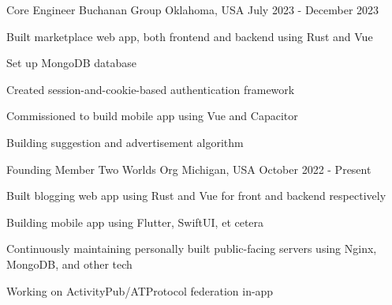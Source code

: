 
\begin{cventries}

   \cventry
   {Core Engineer} %
   {Buchanan Group} %
   {Oklahoma, USA} %
   {July 2023 - December 2023} %
   {
      \begin{cvitems}
         \item {Built marketplace web app, both frontend and backend using Rust and Vue}
         \item {Set up MongoDB database}
         \item {Created session-and-cookie-based authentication framework}
         \item {Commissioned to build mobile app using Vue and Capacitor}
         \item {Building suggestion and advertisement algorithm}
      \end{cvitems}
   }

   \cventry
   {Founding Member} %
   {Two Worlds Org} %
   {Michigan, USA} %
   {October 2022 - Present} %
   {
      \begin{cvitems}
         \item {Built blogging web app using Rust and Vue for front and backend respectively}
         \item {Building mobile app using Flutter, SwiftUI, et cetera}
         \item {Continuously maintaining personally built public-facing servers using Nginx, MongoDB, and other tech}
         \item {Working on ActivityPub/ATProtocol federation in-app}
      \end{cvitems}
   }

\end{cventries}

